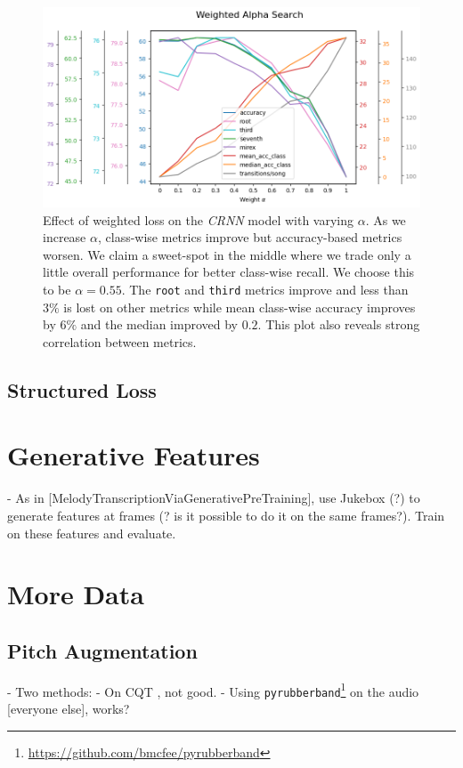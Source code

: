 \begin{figure}[H]
    \centering
    \includegraphics[width=1.0\textwidth]{figures/weight_alpha_search.png}
    \caption{Effect of weighted loss on the \emph{CRNN} model with varying $\alpha$. As we increase $\alpha$, class-wise metrics improve but accuracy-based metrics worsen. We claim a sweet-spot in the middle where we trade only a little overall performance for better class-wise recall. We choose this to be $\alpha = 0.55$. The \texttt{root} and \texttt{third} metrics improve and less than $3\%$ is lost on other metrics while mean class-wise accuracy improves by $6\%$ and the median improved by $0.2$. This plot also reveals strong correlation between metrics. }\label{fig:weighted_loss}
\end{figure}

\subsection{Structured Loss}

\section{Generative Features}

- As in [MelodyTranscriptionViaGenerativePreTraining], use Jukebox (?) to generate features at frames (? is it possible to do it on the same frames?). Train on these features and evaluate.

\section{More Data}

\subsection{Pitch Augmentation}
- Two methods:
- On CQT \citet{ACRLargeVocab1}, not good.
- Using \texttt{pyrubberband}\footnote{\url{https://github.com/bmcfee/pyrubberband}} on the audio [everyone else], works?

